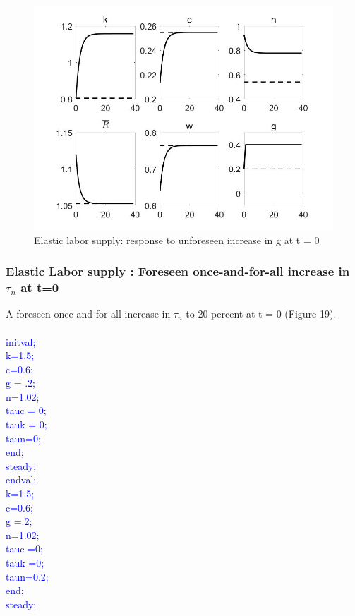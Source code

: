 \documentclass[a4paper,12pt]{scrartcl} %
\begin{document}
\begin{figure}[htbp!]
		\centering
			\includegraphics[width=0.8\linewidth]{fig18.jpg}
            \caption{Elastic labor supply: response to unforeseen increase in g at t = 0}\label{18}
\end{figure}

\subsubsection{Elastic Labor supply : Foreseen once-and-for-all increase in $\tau_n$ at t=0}

A foreseen once-and-for-all increase in $\tau_n$ to 20 percent at t = 0 (Figure 19).\\
\\
\textcolor{blue}{
initval;\\
k=1.5;\\
c=0.6;\\
g = .2;\\
n=1.02;\\
tauc = 0;\\
tauk = 0;\\
taun=0;\\
end;\\
steady;\\
endval;\\
k=1.5;\\
c=0.6;\\
g =.2;\\
n=1.02;\\
tauc =0;\\
tauk =0;\\
taun=0.2;\\
end;\\
steady;}\\
\end{document}
